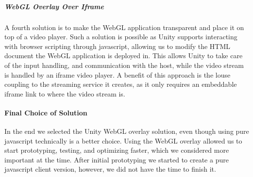\subparagraph{WebGL Overlay Over Iframe}
A fourth solution is to make the WebGL application transparent and place it on top of a video player. Such a solution is possible as Unity supports interacting with browser scripting through javascript\cite{unity_webgl_javascript_interaction}, allowing us to modify the HTML document the WebGL application is deployed in. 
This allows Unity to take care of the input handling, and communication with the host, while the video stream is handled by an iframe video player. A benefit of this approach is the louse coupling to the streaming service it creates, as it only requires an embeddable iframe link to where the video stream is.

    

\paragraph{Final Choice of Solution}
In the end we selected the Unity WebGL overlay solution, even though using pure javascript technically is a better choice. Using the WebGL overlay allowed us to start prototyping, testing, and optimizing faster, which we considered more important at the time. After initial prototyping we started to create a pure javascript client version, however, we did not have the time to finish it.
